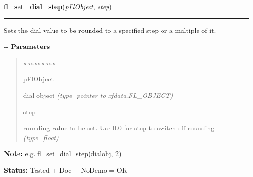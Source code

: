 \hspace{.8\funcindent}\begin{boxedminipage}{\funcwidth}

    \raggedright \textbf{fl\_set\_dial\_step}(\textit{pFlObject}, \textit{step})

    \vspace{-1.5ex}

    \rule{\textwidth}{0.5\fboxrule}
\setlength{\parskip}{2ex}

Sets the dial value to be rounded to a specified step or a
multiple of it.

-{}-
\setlength{\parskip}{1ex}
      \textbf{Parameters}
      \vspace{-1ex}

      \begin{quote}
        \begin{Ventry}{xxxxxxxxx}

          \item[pFlObject]


dial object
            {\it (type=pointer to xfdata.FL\_OBJECT)}

          \item[step]


rounding value to be set. Use 0.0 for step to switch off rounding
            {\it (type=float)}

        \end{Ventry}

      \end{quote}

\textbf{Note:} 
e.g. fl\_set\_dial\_step(dialobj, 2)


\textbf{Status:} 
Tested + Doc + NoDemo = OK


    \end{boxedminipage}

    \label{xformslib:fldial:fl_set_dial_return}

    \vspace{0.5ex}

